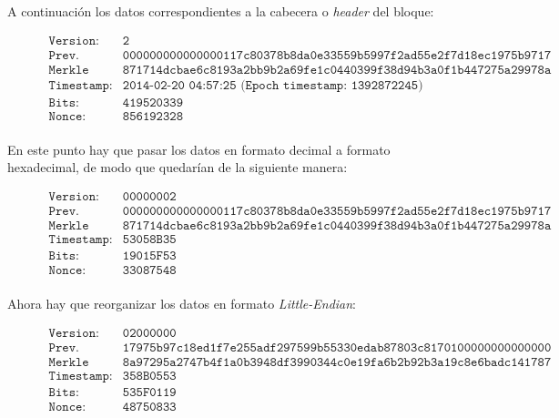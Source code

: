 \documentclass{article}
\begin{document}
    A continuación los datos correspondientes a la cabecera o \textit{header} del bloque:
    \begin{figure}[H]
    \centering
    \scriptsize{
        $\begin{array}{ll}
            \texttt{Version:} & \texttt{2} \\
            \texttt{Prev. Block:} & \texttt{000000000000000117c80378b8da0e33559b5997f2ad55e2f7d18ec1975b9717} \\
            \texttt{Merkle root:} & \texttt{871714dcbae6c8193a2bb9b2a69fe1c0440399f38d94b3a0f1b447275a29978a} \\
            \texttt{Timestamp:} & \texttt{2014-02-20 04:57:25 (Epoch timestamp: 1392872245)} \\
            \texttt{Bits:} & \texttt{419520339} \\
            \texttt{Nonce:} & \texttt{856192328} \\
        \end{array}$
    }
    \end{figure}
    
    En este punto hay que pasar los datos en formato decimal a formato hexadecimal, de modo que quedarían de la siguiente manera:
    \begin{figure}[H]
    \centering
    \scriptsize{
        $\begin{array}{ll}
            \texttt{Version:} & \texttt{00000002} \\
            \texttt{Prev. Block:} & \texttt{000000000000000117c80378b8da0e33559b5997f2ad55e2f7d18ec1975b9717} \\
            \texttt{Merkle root:} & \texttt{871714dcbae6c8193a2bb9b2a69fe1c0440399f38d94b3a0f1b447275a29978a} \\
            \texttt{Timestamp:} & \texttt{53058B35} \\
            \texttt{Bits:} & \texttt{19015F53} \\
            \texttt{Nonce:} & \texttt{33087548} \\
        \end{array}$
    }
    \end{figure}
    
    Ahora hay que reorganizar los datos en formato \textit{Little-Endian}:
    \begin{figure}[H]
    \centering
    \scriptsize{
        $\begin{array}{ll}
            \texttt{Version:} & \texttt{02000000} \\
            \texttt{Prev. Block:} & \texttt{17975b97c18ed1f7e255adf297599b55330edab87803c8170100000000000000} \\
            \texttt{Merkle root:} & \texttt{8a97295a2747b4f1a0b3948df3990344c0e19fa6b2b92b3a19c8e6badc141787} \\
            \texttt{Timestamp:} & \texttt{358B0553} \\
            \texttt{Bits:} & \texttt{535F0119} \\
            \texttt{Nonce:} & \texttt{48750833} \\
        \end{array}$
    }
    \end{figure}
    
\end{document}
